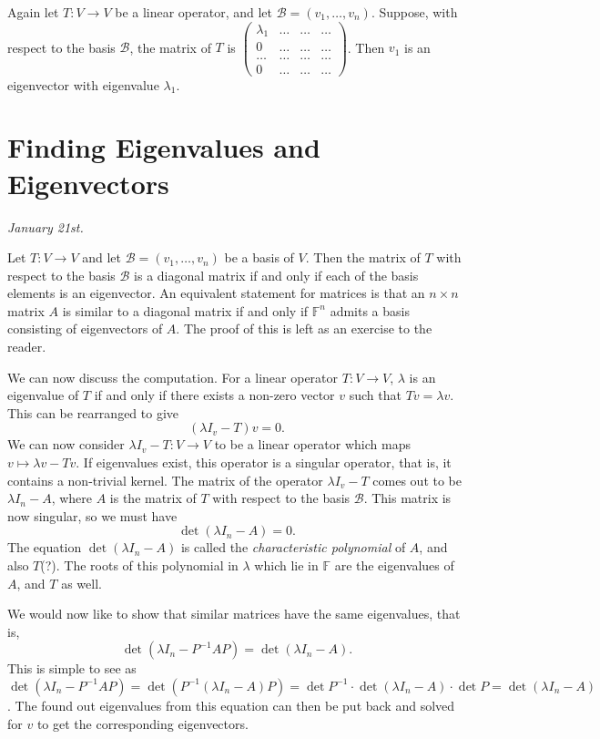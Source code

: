 \documentclass[15pt,a4paper]{book}
\theoremstyle{definition}
\newcommand{\eax}[1]{\emph{#1}\index{#1}} %
\newcommand{\mc}[1]{\mathcal{#1}}
\newcommand{\F}{\mathbb{F}}
\begin{document}
Again let $T: V \to V$ be a linear operator, and let $\mc{B} = (v_{1},\ldots,v_{n})$. Suppose, with respect to the basis $\mc{B}$, the matrix of $T$ is $\begin{pmatrix}
    \lambda_{1} & \ldots & \ldots & \ldots \\ 0 & \ldots & \ldots & \ldots \\ \ldots & \ldots & \ldots & \ldots \\ 0 & \ldots & \ldots & \ldots    
\end{pmatrix}$. Then $v_{1}$ is an eigenvector with eigenvalue $\lambda_{1}$.
\section{Finding Eigenvalues and Eigenvectors}
\textit{January 21st.}

Let $T:V \to V$ and let $\mc{B} = (v_{1},\ldots,v_{n})$ be a basis of $V$. Then the matrix of $T$ with respect to the basis $\mc{B}$ is a diagonal matrix if and only if each of the basis elements is an eigenvector. An equivalent statement for matrices is that an $n \times n$ matrix $A$ is similar to a diagonal matrix if and only if $\F^{n}$ admits a basis consisting of eigenvectors of $A$. The proof of this is left as an exercise to the reader.

We can now discuss the computation. For a linear operator $T: V \to V$, $\lambda$ is an eigenvalue of $T$ if and only if there exists a non-zero vector $v$ such that $Tv = \lambda v$. This can be rearranged to give
\begin{equation}
    (\lambda I_{v} -T)v = 0.
\end{equation}
We can now consider $\lambda I_{v} - T: V \to V$ to be a linear operator which maps $v \mapsto \lambda v - Tv$. If eigenvalues exist, this operator is a singular operator, that is, it contains a non-trivial kernel. The matrix of the operator $\lambda I_{v} - T$ comes out to be $\lambda I_{n} - A$, where $A$ is the matrix of $T$ with respect to the basis $\mc{B}$. This matrix is now singular, so we must have
\begin{equation}
    \det(\lambda I_{n} - A) = 0.
\end{equation}
The equation $\det(\lambda I_{n} - A)$ is called the \eax{characteristic polynomial} of $A$, and also $T$(?). The roots of this polynomial in $\lambda$ which lie in $\F$ are the eigenvalues of $A$, and $T$ as well.

We would now like to show that similar matrices have the same eigenvalues, that is,
\begin{equation}
    \det(\lambda I_{n} - P^{-1}AP) = \det(\lambda I_{n} - A).
\end{equation}
This is simple to see as $\det(\lambda I_{n} - P^{-1}AP) = \det(P^{-1}(\lambda I_{n} - A)P) = \det P^{-1} \cdot \det(\lambda I_{n} - A) \cdot \det P = \det(\lambda I_{n} - A)$. The found out eigenvalues from this equation can then be put back and solved for $v$ to get the corresponding eigenvectors.
\end{document}
